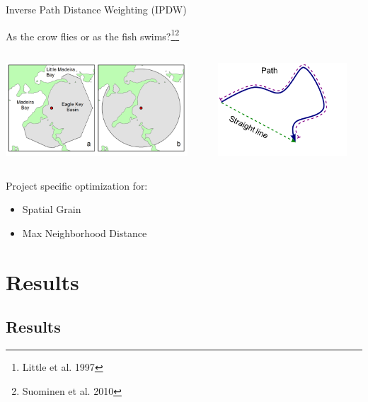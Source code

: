 \documentclass[compress,noflama,nosectionpages]{beamer}
\begin{document}
\begin{frame}{Inverse Path Distance Weighting (IPDW)}

As the crow flies or as the fish swims?\footnote{Little et al. 1997}\footnote[frame]{Suominen et al. 2010}
\vspace{3pt}
 	\begin{columns}
   	\begin{column}{6.8cm}
     	\includegraphics[width=6.8cm,keepaspectratio=true,clip=true,trim= 0mm 0mm 0mm 0mm]{figures/sm-figure1.png}
 		\end{column}
 		
 		\begin{column}{5.4cm}
     	\includegraphics[width=4.8cm,keepaspectratio=true]{images/Picture1.png}
   	\end{column}
 \end{columns}
	Project specific optimization for: 
	\begin{itemize}
		\item{Spatial Grain}
		\item{Max Neighborhood Distance}
	\end{itemize}
\end{frame}


\section{Results}
	\subsection{Results}
\end{document}
